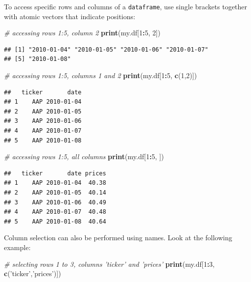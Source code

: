 \documentclass[11pt,]{book}
\newenvironment{Shaded}{\begin{snugshade}}{\end{snugshade}}
\newcommand{\KeywordTok}[1]{\textcolor[rgb]{0.27,0.27,0.27}{\textbf{#1}}}
\newcommand{\DecValTok}[1]{\textcolor[rgb]{0.06,0.06,0.06}{#1}}
\newcommand{\StringTok}[1]{\textcolor[rgb]{0.5,0.5,0.5}{#1}}
\newcommand{\CommentTok}[1]{\textcolor[rgb]{0.56,0.35,0.01}{\textit{#1}}}
\newcommand{\OperatorTok}[1]{\textcolor[rgb]{0.81,0.36,0.00}{\textbf{#1}}}
\newcommand{\NormalTok}[1]{#1}
\begin{document}
To access specific rows and columns of a \texttt{dataframe}, use single
brackets together with atomic vectors that indicate positions:

\begin{Shaded}
\begin{Highlighting}[]
\CommentTok{# accessing rows 1:5, column 2}
\KeywordTok{print}\NormalTok{(my.df[}\DecValTok{1}\OperatorTok{:}\DecValTok{5}\NormalTok{, }\DecValTok{2}\NormalTok{])}
\end{Highlighting}
\end{Shaded}

\begin{verbatim}
## [1] "2010-01-04" "2010-01-05" "2010-01-06" "2010-01-07"
## [5] "2010-01-08"
\end{verbatim}

\begin{Shaded}
\begin{Highlighting}[]
\CommentTok{# accessing rows 1:5, columns 1 and 2}
\KeywordTok{print}\NormalTok{(my.df[}\DecValTok{1}\OperatorTok{:}\DecValTok{5}\NormalTok{, }\KeywordTok{c}\NormalTok{(}\DecValTok{1}\NormalTok{,}\DecValTok{2}\NormalTok{)])}
\end{Highlighting}
\end{Shaded}

\begin{verbatim}
##   ticker       date
## 1    AAP 2010-01-04
## 2    AAP 2010-01-05
## 3    AAP 2010-01-06
## 4    AAP 2010-01-07
## 5    AAP 2010-01-08
\end{verbatim}

\begin{Shaded}
\begin{Highlighting}[]
\CommentTok{# accessing rows 1:5, all columns}
\KeywordTok{print}\NormalTok{(my.df[}\DecValTok{1}\OperatorTok{:}\DecValTok{5}\NormalTok{, ])}
\end{Highlighting}
\end{Shaded}

\begin{verbatim}
##   ticker       date prices
## 1    AAP 2010-01-04  40.38
## 2    AAP 2010-01-05  40.14
## 3    AAP 2010-01-06  40.49
## 4    AAP 2010-01-07  40.48
## 5    AAP 2010-01-08  40.64
\end{verbatim}

Column selection can also be performed using names. Look at the
following example:

\begin{Shaded}
\begin{Highlighting}[]
\CommentTok{# selecting rows 1 to 3, columns 'ticker' and 'prices'}
\KeywordTok{print}\NormalTok{(my.df[}\DecValTok{1}\OperatorTok{:}\DecValTok{3}\NormalTok{, }\KeywordTok{c}\NormalTok{(}\StringTok{'ticker'}\NormalTok{,}\StringTok{'prices'}\NormalTok{)])}
\end{Highlighting}
\end{Shaded}
\end{document}
